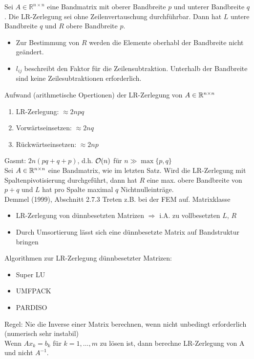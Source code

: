 \satz Sei $A \in \mathbb{R}^{n \times n}$ eine Bandmatrix mit oberer Bandbreite $p$
und unterer Bandbreite $q$. Die LR-Zerlegung sei ohne Zeilenvertauschung durchführbar.
Dann hat $L$ untere Bandbreite $q$ und $R$ obere Bandbreite $p$.\\
\beweis
\begin{itemize}
  \item Zur Bestimmung von $R$ werden die Elemente oberhabl der Bandbreite nicht geändert.
  \item $l_{ij}$ beschreibt den Faktor für die Zeilensubtraktion. Unterhalb der Bandbreite
    sind keine Zeilesubtraktionen erforderlich.
\end{itemize}
Aufwand (arithmetische Opertionen) der LR-Zerlegung von $A \in \mathbb{R}^{n \times n}$
\begin{enumerate}
  \item LR-Zerlegung: $\approx 2 n pq$
  \item Vorwärtseinsetzen: $\approx 2 nq$
  \item Rückwärtseinsetzen: $\approx 2 np$
\end{enumerate}
Gasmt: $2n (pq + q + p)$, d.h. $\mathcal{O}(n)$ für $n \gg \max\{ p, q \}$\\
\satz Sei $A \in \mathbb{R}^{n \times n}$ eine Bandmatrix, wie im letzten Satz. Wird die LR-Zerlegung
mit Spaltenpivotisierung durchgeführt, dann hat $R$ eine max. obere Bandbreite von
$p + q$ und $L$ hat pro Spalte maximal $q$ Nichtnulleinträge.\\
\beweis Demmel (1999), Abschnitt 2.7.3
Treten z.B. bei der FEM auf.  Matrixklasse
\begin{itemize}
  \item LR-Zerlegung von dünnbesetzten Matrizen $\Rightarrow$ i.A. zu vollbesetzten $L$, $R$
  \item Durch Umsortierung lässt sich eine dünnbesetzte Matrix auf Bandstruktur bringen
\end{itemize}
Algorithmen zur LR-Zerlegung dünnbesetzter Matrizen:
\begin{itemize}
  \item Super LU
  \item UMFPACK
  \item PARDISO
\end{itemize}
Regel: Nie die Inverse einer Matrix berechnen, wenn nicht unbedingt erforderlich (numerisch sehr instabil)\\
Wenn $Ax_k = b_k$ für $k = 1,\ldots,m$ zu lösen ist, dann berechne LR-Zerlegung von A und nicht $A^{-1}$.\\

